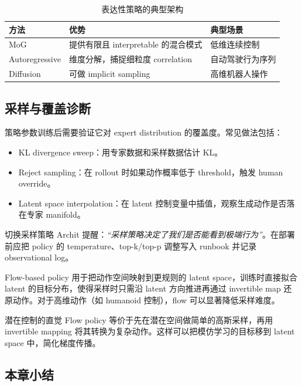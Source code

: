 \documentclass[a4paper]{article}
\begin{document}
\begin{table}[H]
\centering
\begin{tabular}{p{} p{} p{}}
\toprule
方法 & 优势 & 典型场景 \\
\midrule
MoG & 提供有限且 interpretable 的混合模式 & 低维连续控制 \\
Autoregressive & 维度分解，捕捉细粒度 correlation & 自动驾驶行为序列 \\
Diffusion & 可做 implicit sampling & 高维机器人操作 \\
\bottomrule
\end{tabular}
\caption{表达性策略的典型架构}
\end{table}

\subsection{采样与覆盖诊断}

策略参数训练后需要验证它对 expert distribution 的覆盖度。常见做法包括：
\begin{itemize}
    \item KL divergence sweep：用专家数据和采样数据估计 KL。
    \item Reject sampling：在 rollout 时如果动作概率低于 threshold，触发 human override。
    \item Latent space interpolation：在 latent 控制变量中插值，观察生成动作是否落在专家 manifold。
\end{itemize}

\begin{knowledgebox}{切换采样策略}
Archit 提醒：\textit{``采样策略决定了我们是否能看到极端行为''}。在部署前应把 policy 的 temperature、top-k/top-p 调整写入 runbook 并记录 observational log。
\end{knowledgebox}

Flow-based policy 用于把动作空间映射到更规则的 latent space，训练时直接拟合 latent 的目标分布，使得采样时只需沿 latent 方向推进再通过 invertible map 还原动作。对于高维动作（如 humanoid 控制），flow 可以显著降低采样难度。

\begin{importantbox}{潜在控制的直觉}
Flow policy 等价于先在潜在空间做简单的高斯采样，再用 invertible mapping 将其转换为复杂动作。这样可以把模仿学习的目标移到 latent space 中，简化梯度传播。
\end{importantbox}

\subsection{本章小结}
\end{document}
